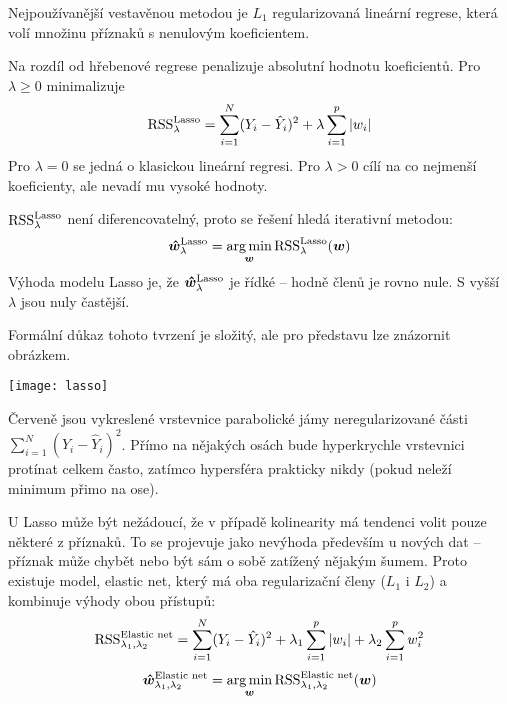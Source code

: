 Nejpoužívanější vestavěnou metodou je $L_1$ regularizovaná lineární regrese, která volí množinu příznaků s nenulovým koeficientem.

Na rozdíl od hřebenové regrese penalizuje absolutní hodnotu koeficientů. Pro $\lambda \ge 0$ minimalizuje
\[
    \operatorname{RSS}_\lambda^{\text{Lasso}} = \sum_{i=1}^{N} (Y_i - \hat{Y}_i)^2
    + \lambda \sum_{i=1}^{p} |w_i|
\]
Pro $\lambda = 0$ se jedná o klasickou lineární regresi. Pro $\lambda > 0$ cílí na co nejmenší koeficienty, ale nevadí mu vysoké hodnoty.

$\operatorname{RSS}_\lambda^{\text{Lasso}}$ není diferencovatelný, proto se řešení hledá iterativní metodou:
\[
    \bm{\hat{w}}_\lambda^{\text{Lasso}} = \operatorname*{arg\,min}_{\bm{w}} \operatorname{RSS}_\lambda^{\text{Lasso}} (\bm{w})
\]
Výhoda modelu Lasso je, že $\bm{\hat{w}}_\lambda^{\text{Lasso}}$ je řídké -- hodně členů je rovno nule. S vyšší $\lambda$ jsou nuly častější.

Formální důkaz tohoto tvrzení je složitý, ale pro představu lze znázornit obrázkem.

\begin{center}
    \texttt{[image: lasso]}
\end{center}

Červeně jsou vykreslené vrstevnice parabolické jámy neregularizované části ${\sum_{i=1}^{N} (Y_i - \hat{Y}_i)^2}$. Přímo na nějakých osách bude hyperkrychle vrstevnici protínat celkem často, zatímco hypersféra prakticky nikdy (pokud neleží minimum přimo na ose).

U Lasso může být nežádoucí, že v případě kolinearity má tendenci volit pouze některé z příznaků. To se projevuje jako nevýhoda především u nových dat -- příznak může chybět nebo být sám o sobě zatížený nějakým šumem. Proto existuje model, elastic net, který má oba regularizační členy ($L_1$ i $L_2$) a kombinuje výhody obou přístupů:
\[
    \operatorname{RSS}_{\lambda_1, \lambda_2}^{\text{Elastic net}} = \sum_{i=1}^{N} (Y_i - \hat{Y}_i)^2
    + \lambda_1 \sum_{i=1}^{p} |w_i|
    + \lambda_2 \sum_{i=1}^{p} w_i^2
\]
\[
    \bm{\hat{w}}_{\lambda_1, \lambda_2}^{\text{Elastic net}}
    = \operatorname*{arg\,min}_{\bm{w}} \operatorname{RSS}_{\lambda_1, \lambda_2}^{\text{Elastic net}} (\bm{w})
\]
